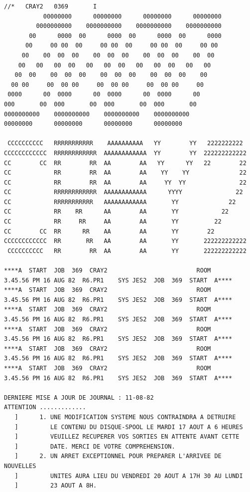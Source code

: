 {\tiny
\begin{verbatim}
//*   CRAY2   0369       I
           00000000      00000000      00000000      00000000
         0000000000    0000000000    0000000000    0000000000
       00      0000  00      0000  00      0000  00      0000
      00     00 00  00     00 00  00     00 00  00     00 00
     00    00  00  00    00  00  00    00  00  00    00  00
    00   00   00  00   00   00  00   00   00  00   00   00
   00  00    00  00  00    00  00  00    00  00  00    00
  00 00     00  00 00     00  00 00     00  00 00     00
 0000      00  0000      00  0000      00  0000      00
000       00  000       00  000       00  000       00
0000000000    0000000000    0000000000    0000000000
00000000      00000000      00000000      00000000

 CCCCCCCCCC   RRRRRRRRRRR    AAAAAAAAAA   YY        YY   2222222222
CCCCCCCCCCCC  RRRRRRRRRRRR  AAAAAAAAAAAA  YY        YY  222222222222
CC        CC  RR        RR  AA        AA   YY      YY   22        22
CC            RR        RR  AA        AA    YY    YY              22
CC            RR        RR  AA        AA     YY  YY               22
CC            RRRRRRRRRRRR  AAAAAAAAAAAA      YYYY               22
CC            RRRRRRRRRRR   AAAAAAAAAAAA       YY              22
CC            RR    RR      AA        AA       YY            22
CC            RR     RR     AA        AA       YY          22
CC        CC  RR      RR    AA        AA       YY        22
CCCCCCCCCCCC  RR       RR   AA        AA       YY       222222222222
 CCCCCCCCCC   RR        RR  AA        AA       YY       222222222222

****A  START  JOB  369  CRAY2                         ROOM        3.45.56 PM 16 AUG 82  R6.PR1    SYS JES2  JOB  369  START  A****
****A  START  JOB  369  CRAY2                         ROOM        3.45.56 PM 16 AUG 82  R6.PR1    SYS JES2  JOB  369  START  A****
****A  START  JOB  369  CRAY2                         ROOM        3.45.56 PM 16 AUG 82  R6.PR1    SYS JES2  JOB  369  START  A****
****A  START  JOB  369  CRAY2                         ROOM        3.45.56 PM 16 AUG 82  R6.PR1    SYS JES2  JOB  369  START  A****
****A  START  JOB  369  CRAY2                         ROOM        3.45.56 PM 16 AUG 82  R6.PR1    SYS JES2  JOB  369  START  A****
****A  START  JOB  369  CRAY2                         ROOM        3.45.56 PM 16 AUG 82  R6.PR1    SYS JES2  JOB  369  START  A****

DERNIERE MISE A JOUR DE JOURNAL : 11-08-82
ATTENTION .............
   ]      1. UNE MODIFICATION SYSTEME NOUS CONTRAINDRA A DETRUIRE
   ]         LE CONTENU DU DISQUE-SPOOL LE MARDI 17 AOUT A 6 HEURES
   ]         VEUILLEZ RECUPERER VOS SORTIES EN ATTENTE AVANT CETTE
   ]         DATE. MERCI DE VOTRE COMPREHENSION.
   ]      2. UN ARRET EXCEPTIONNEL POUR PREPARER L'ARRIVEE DE NOUVELLES
   ]         UNITES AURA LIEU DU VENDREDI 20 AOUT A 17H 30 AU LUNDI
   ]         23 AOUT A 8H.
\end{verbatim}
}

